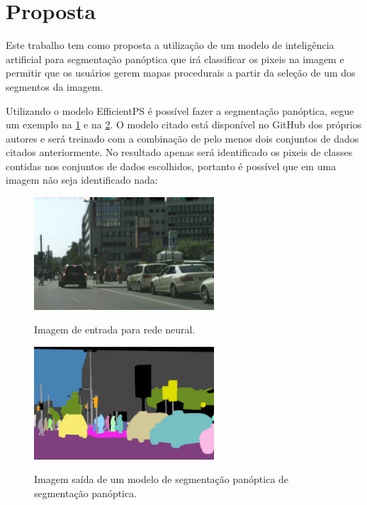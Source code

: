 \section{Proposta}

Este trabalho tem como proposta a utilização de um modelo de inteligência artificial para segmentação panóptica que irá classificar os pixeis na imagem e permitir que os usuários gerem mapas procedurais a partir da seleção de um dos segmentos da imagem.

Utilizando o modelo EfficientPS é possível fazer a segmentação panóptica, segue um exemplo na \cref{fig:segmantations_1} e na \cref{fig:segmantations_2}. O modelo citado está disponível no GitHub dos próprios autores \space{} e será treinado com a combinação de pelo menos dois conjuntos de dados citados anteriormente. No resultado apenas será identificado os pixeis de classes contidas nos conjuntos de dados escolhidos, portanto é possível que em uma imagem não seja identificado nada:

\begin{figure}[!ht]
	\centering
    \caption{Imagem de entrada para rede neural.}
	\includegraphics[width=0.6\textwidth]{figures/segmantations_1.png}
	\label{fig:segmantations_1}
\end{figure}

\begin{figure}[!ht]
	\centering
    \caption{Imagem saída de um modelo de segmentação panóptica de segmentação panóptica.}
	\includegraphics[width=0.6\textwidth]{figures/segmantations_2.png}
	\label{fig:segmantations_2}
\end{figure}

